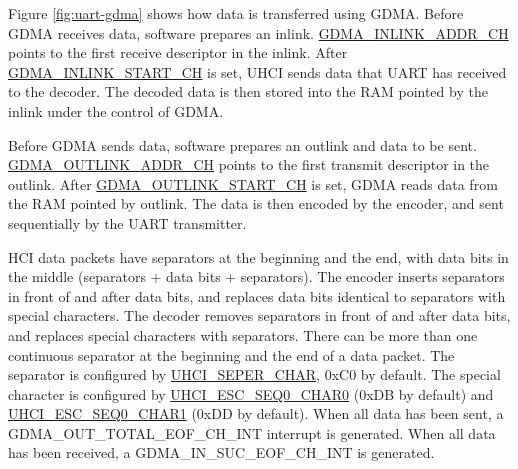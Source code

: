 \documentclass[main\_\_EN.tex]{subfiles}
\begin{document}
Figure \ref{fig:uart-gdma} shows how data is transferred using GDMA. Before GDMA receives data, software prepares an inlink. \hyperref[fielddesc:GDMAINLINKADDRCHN]{GDMA\_INLINK\_ADDR\_CH} points to the first receive descriptor in the inlink. After \hyperref[fielddesc:GDMAINLINKSTARTCHN]{GDMA\_INLINK\_START\_CH} is set, UHCI sends data that UART has received to the decoder. The decoded data is then stored into the RAM pointed by the inlink under the control of GDMA.

Before GDMA sends data, software prepares an outlink and data to be sent. \hyperref[fielddesc:GDMAOUTLINKADDRCHN]{GDMA\_OUTLINK\_ADDR\_CH} points to the first transmit descriptor in the outlink. After \hyperref[fielddesc:GDMAOUTLINKSTARTCHN]{GDMA\_OUTLINK\_START\_CH} is set, GDMA reads data from the RAM pointed by outlink. The data is then encoded by the encoder, and sent sequentially by the UART transmitter.

HCI data packets have separators at the beginning and the end, with data bits in the middle (separators + data bits + separators). The encoder inserts separators in front of and after data bits, and replaces data bits identical to separators with special characters. The decoder removes separators in front of and after data bits, and replaces special characters with separators. There can be more than one continuous separator at the beginning and the end of a data packet. The separator is configured by \hyperref[fielddesc:UHCISEPERCHAR]{UHCI\_SEPER\_CHAR}, 0xC0 by default. The special character is configured by \hyperref[fielddesc:UHCIESCSEQ0CHAR0]{UHCI\_ESC\_SEQ0\_CHAR0} (0xDB by default) and \hyperref[fielddesc:UHCIESCSEQ0CHAR1]{UHCI\_ESC\_SEQ0\_CHAR1} (0xDD by default). When all data has been sent, a GDMA\_OUT\_TOTAL\_EOF\_CH\_INT interrupt is generated. When all data has been received, a GDMA\_IN\_SUC\_EOF\_CH\_INT is generated.
\end{document}
